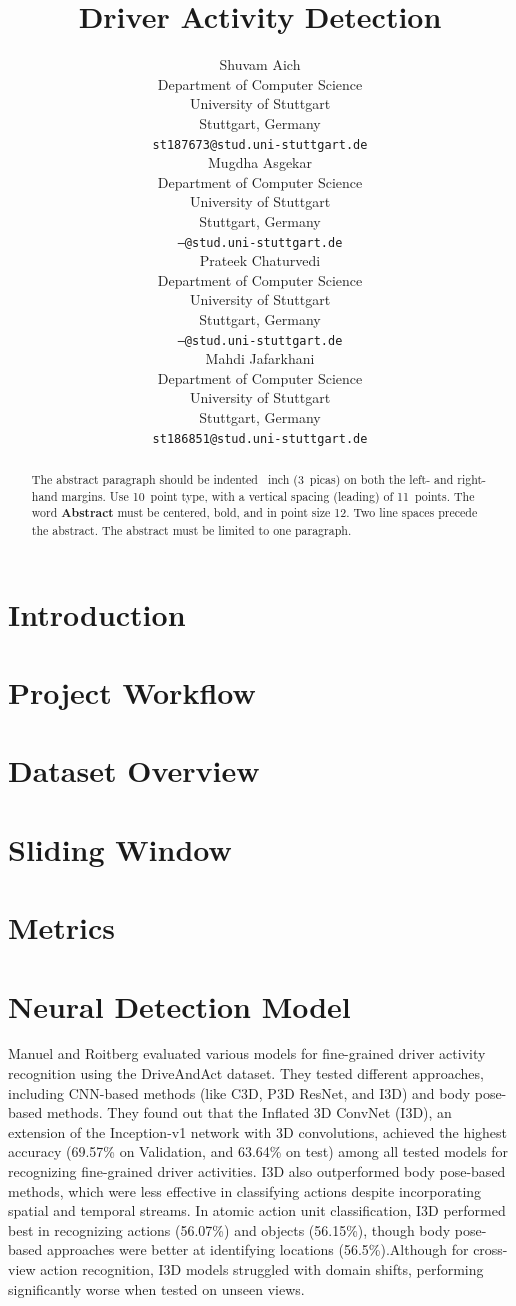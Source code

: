 \documentclass{article}
\title{Driver Activity Detection}
\author{%
  Shuvam Aich \\
  Department of Computer Science\\
  University of Stuttgart\\
  Stuttgart, Germany \\
  \texttt{st187673@stud.uni-stuttgart.de} \\
  \And
  Mugdha Asgekar \\
  Department of Computer Science\\
  University of Stuttgart\\
  Stuttgart, Germany \\
  \texttt{---@stud.uni-stuttgart.de} \\
  \AND
  Prateek Chaturvedi \\
  Department of Computer Science\\
  University of Stuttgart\\
  Stuttgart, Germany \\
  \texttt{---@stud.uni-stuttgart.de} \\
  \And
  Mahdi Jafarkhani \\
  Department of Computer Science\\
  University of Stuttgart\\
  Stuttgart, Germany \\
  \texttt{st186851@stud.uni-stuttgart.de} \\
}
\begin{document}
\maketitle


\begin{abstract}
  The abstract paragraph should be indented ~inch (3~picas) on
  both the left- and right-hand margins. Use 10~point type, with a vertical
  spacing (leading) of 11~points.  The word \textbf{Abstract} must be centered,
  bold, and in point size 12. Two line spaces precede the abstract. The abstract
  must be limited to one paragraph.
\end{abstract}


\section{Introduction}

\section{Project Workflow}

\section{Dataset Overview}

\section{Sliding Window}

\section{Metrics}

\section{Neural Detection Model}
Manuel and Roitberg \cite{drive_and_act_2019_iccv} evaluated various models for fine-grained driver activity recognition using the DriveAndAct dataset. They tested different approaches, including CNN-based methods (like C3D, P3D ResNet, and I3D) and body pose-based methods. They found out that the Inflated 3D ConvNet (I3D), an extension of the Inception-v1 network with 3D convolutions, achieved the highest accuracy (69.57\% on Validation, and 63.64\% on test) among all tested models for recognizing fine-grained driver activities.
I3D also outperformed body pose-based methods, which were less effective in classifying actions despite incorporating spatial and temporal streams.
In atomic action unit classification, I3D performed best in recognizing actions (56.07\%) and objects (56.15\%), though body pose-based approaches were better at identifying locations (56.5\%).Although for cross-view action recognition, I3D models struggled with domain shifts, performing significantly worse when tested on unseen views.
\end{document}
